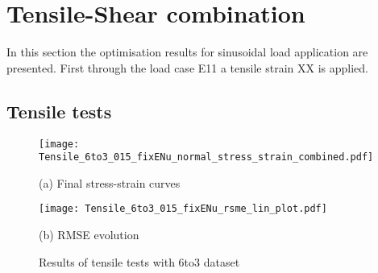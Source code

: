 



\section{Tensile-Shear combination}
In this section the optimisation results for sinusoidal load application are presented. First through the load case E11 a tensile strain  XX is applied. 

\subsection{Tensile tests}
\begin{figure}[H]
    \centering
    \begin{minipage}[t]{0.495\textwidth}
        \centering
        \texttt{[image: Tensile\_6to3\_015\_fixENu\_normal\_stress\_strain\_combined.pdf]}
        \caption*{(a) Final stress-strain curves}
        \label{fig:tensileStressStrain6to3}
    \end{minipage}
    \hfill
    \begin{minipage}[t]{0.495\textwidth}
        \centering
        \texttt{[image: Tensile\_6to3\_015\_fixENu\_rsme\_lin\_plot.pdf]}
        \caption*{(b) RMSE evolution}
        \label{subfigure:tensileRMSE}
    \end{minipage}
    \caption{Results of tensile tests with 6to3 dataset}
    \label{fig:tensileResults6to3}
\end{figure}


